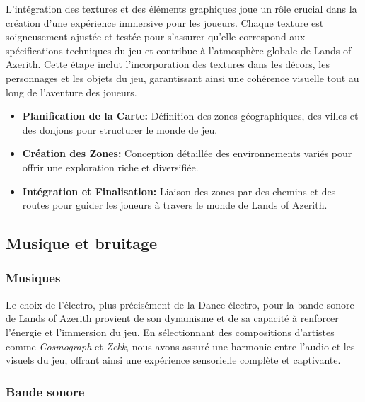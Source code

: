 L'intégration des textures et des éléments graphiques joue un rôle crucial dans la création d'une expérience immersive pour les joueurs. Chaque texture est soigneusement ajustée et testée pour s'assurer qu'elle correspond aux spécifications techniques du jeu et contribue à l'atmosphère globale de Lands of Azerith. Cette étape inclut l'incorporation des textures dans les décors, les personnages et les objets du jeu, garantissant ainsi une cohérence visuelle tout au long de l'aventure des joueurs.
\\

\begin{itemize}

      \item \textbf{Planification de la Carte:} Définition des zones géographiques, des villes et des donjons pour structurer le monde de jeu.
            \\

      \item \textbf{Création des Zones:} Conception détaillée des environnements variés pour offrir une exploration riche et diversifiée.
            \\

      \item \textbf{Intégration et Finalisation:} Liaison des zones par des chemins et des routes pour guider les joueurs à travers le monde de Lands of Azerith.
            \\

\end{itemize}

\subsection{Musique et bruitage}

\subsubsection{Musiques}

Le choix de l'électro, plus précisément de la Dance électro, pour la bande sonore de Lands of Azerith provient de son dynamisme et de sa capacité à renforcer l'énergie et l'immersion du jeu.
En sélectionnant des compositions d'artistes comme \textit{Cosmograph} et \textit{Zekk}, nous avons assuré une harmonie entre l'audio et les visuels du jeu, offrant ainsi une expérience sensorielle complète et captivante.

\subsubsection{Bande sonore}


